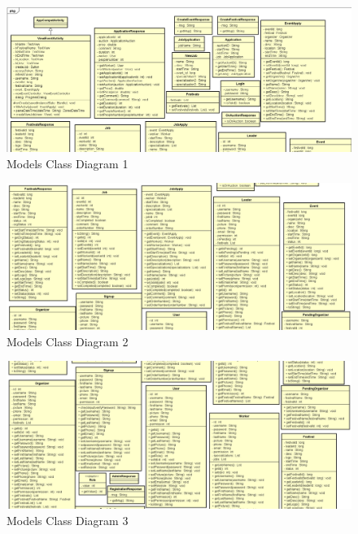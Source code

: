 		\begin{figure}[H]
			\includegraphics[width=\linewidth]{diagrams/Models Class Diagram_1.png}
			\caption{Models Class Diagram 1}
			\label{fig:models_class_diag_1}
		\end{figure}
	
		\begin{figure}[H]
			\includegraphics[width=\linewidth]{diagrams/Models Class Diagram_2.png}
			\caption{Models Class Diagram 2}
			\label{fig:models_class_diag_2}
		\end{figure}
		
		\begin{figure}[H]
			\includegraphics[width=\linewidth]{diagrams/Models Class Diagram_3.png}
			\caption{Models Class Diagram 3}
			\label{fig:models_class_diag_3}
		\end{figure}
	
